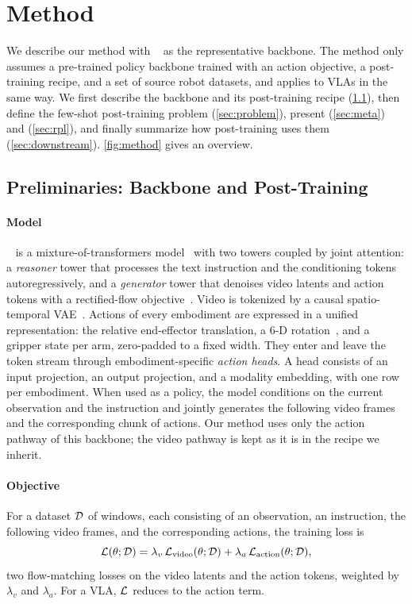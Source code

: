 \section{Method}
\label{sec:method}



We describe our method with \base~\cite{cosmos3} as the representative backbone.
The method only assumes a pre-trained policy backbone trained with an action objective, a post-training recipe, and a set of source robot datasets, and applies to VLAs in the same way.
We first describe the backbone and its post-training recipe (\cref{sec:prelim}), then define the few-shot post-training problem (\cref{sec:problem}), present \Method (\cref{sec:meta}) and \Rpl (\cref{sec:rpl}), and finally summarize how post-training uses them (\cref{sec:downstream}).
\cref{fig:method} gives an overview.

\subsection{Preliminaries: Backbone and Post-Training}
\label{sec:prelim}

\paragraph{Model}
\base~\cite{cosmos3} is a mixture-of-transformers model~\cite{liang2024mot} with two towers coupled by joint attention: a \emph{reasoner} tower that processes the text instruction and the conditioning tokens autoregressively, and a \emph{generator} tower that denoises video latents and action tokens with a rectified-flow objective~\cite{lipman2023flow,liu2023rectified}.
Video is tokenized by a causal spatio-temporal VAE~\cite{wan2025}.
Actions of every embodiment are expressed in a unified representation: the relative end-effector translation, a 6-D rotation~\cite{zhou2019rot6d}, and a gripper state per arm, zero-padded to a fixed width.
They enter and leave the token stream through embodiment-specific \emph{action heads}.
A head consists of an input projection, an output projection, and a modality embedding, with one row per embodiment.
When used as a policy, the model conditions on the current observation and the instruction and jointly generates the following video frames and the corresponding chunk of actions.
Our method uses only the action pathway of this backbone; the video pathway is kept as it is in the recipe we inherit.

\paragraph{Objective}
For a dataset $\mathcal{D}$ of windows, each consisting of an observation, an instruction, the following video frames, and the corresponding actions, the training loss is
\begin{equation}
  \mathcal{L}(\theta;\mathcal{D}) = \lambda_v\,\mathcal{L}_{\mathrm{video}}(\theta;\mathcal{D}) + \lambda_a\,\mathcal{L}_{\mathrm{action}}(\theta;\mathcal{D}),
  \label{eq:loss}
\end{equation}
two flow-matching losses on the video latents and the action tokens, weighted by $\lambda_v$ and $\lambda_a$.
For a VLA, $\mathcal{L}$ reduces to the action term.

